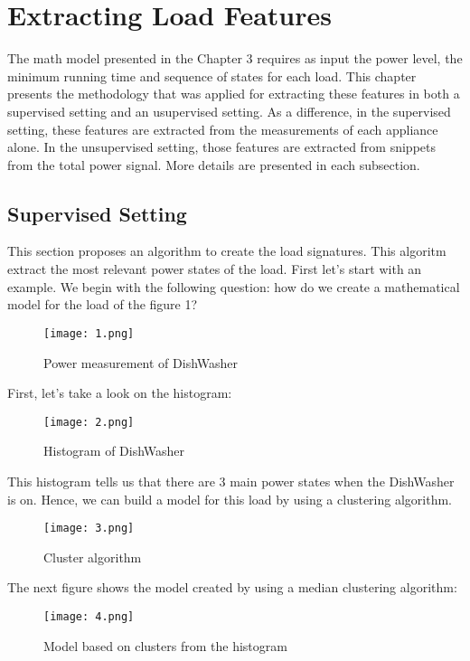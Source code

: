 \chapter{Extracting Load Features}
The math model presented in the Chapter 3 requires as input the power level, the minimum running time and sequence of states for each load. This chapter presents the methodology that was applied for extracting these features in both a supervised setting and an usupervised setting. As a difference, in the supervised setting, these features are extracted from the measurements of each appliance alone. In the unsupervised setting, those features are extracted from snippets from the total power signal. More details are presented in each subsection. 


\section{Supervised Setting}

This section proposes an algorithm to create the load signatures. This algoritm extract the most relevant power states of the load. First let’s start with an example. We begin with the following question: how do we create a mathematical model for the load of the figure 1?

\begin{figure}[tb]
    \centering
    \texttt{[image: 1.png]}
    \caption{Power measurement of DishWasher}
    \label{ch31}
\end{figure}

First, let’s take a look on the histogram:
\begin{figure}[tb]
    \centering
    \texttt{[image: 2.png]}
    \caption{Histogram of DishWasher}
    \label{ch32}
\end{figure}


This histogram tells us that there are 3 main power states when the DishWasher is on. Hence, we can build a model for this load by using a clustering algorithm. 

\begin{figure}[tb]
    \centering
    \texttt{[image: 3.png]}
    \caption{Cluster algorithm}
    \label{ch33}
\end{figure}

The next figure shows the model created by using a median clustering algorithm:

\begin{figure}[tb]
    \centering
    \texttt{[image: 4.png]}
    \caption{Model based on clusters from the histogram}
    \label{ch34}
\end{figure}

